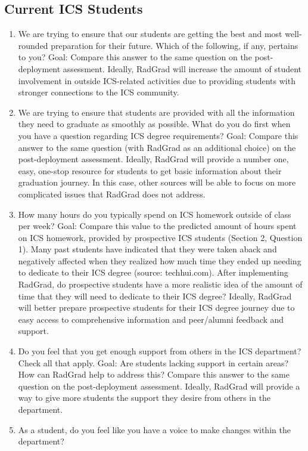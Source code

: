 \subsection{Current ICS Students}
\begin{enumerate}
\item We are trying to ensure that our students are getting the best and most well-rounded preparation for their future. Which of the following, if any, pertains to you? 
Goal: Compare this answer to the same question on the post-deployment assessment. Ideally, RadGrad will increase the amount of student involvement in outside ICS-related activities due to providing students with stronger connections to the ICS community.
\item We are trying to ensure that students are provided with all the information they need to graduate as smoothly as possible. What do you do first when you have a question regarding ICS degree requirements?
Goal: Compare this answer to the same question (with RadGrad as an additional choice) on the post-deployment assessment. Ideally, RadGrad will provide a number one, easy, one-stop resource for students to get basic information about their graduation journey. In this case, other sources will be able to focus on more complicated issues that RadGrad does not address.
\item How many hours do you typically spend on ICS homework outside of class per week?
Goal: Compare this value to the predicted amount of hours spent on ICS homework, provided by prospective ICS students (Section 2, Question 1). Many past students have indicated that they were taken aback and negatively affected when they realized how much time they ended up needing to dedicate to their ICS degree (source: techhui.com). After implementing RadGrad, do prospective students have a more realistic idea of the amount of time that they will need to dedicate to their ICS degree? Ideally, RadGrad will better prepare prospective students for their ICS degree journey due to easy access to comprehensive information and peer/alumni feedback and support.
\item Do you feel that you get enough support from others in the ICS department? Check all that apply.
Goal: Are students lacking support in certain areas? How can RadGrad help to address this? Compare this answer to the same question on the post-deployment assessment. Ideally, RadGrad will provide a way to give more students the support they desire from others in the department. 
\item As a student, do you feel like you have a voice to make changes within the department?

\end{enumerate}
